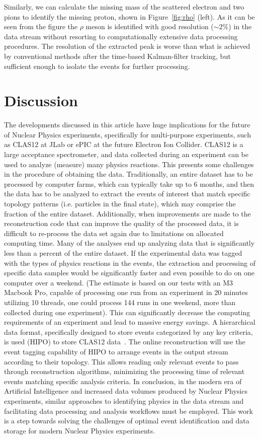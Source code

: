 \documentclass[a4paper,11pt]{article}
\begin{document}
Similarly, we can calculate the missing mass of the scattered electron and two pions to identify the missing proton, shown in Figure~\ref{fig:rho} (left). 
As it can be seen from the figure the $\rho$ meson is identified with good resolution ($\sim 2\%$) in the data stream without resorting to computationally extensive data processing procedures. The resolution of the extracted peak is worse than what is achieved by conventional methods after the time-based Kalman-filter tracking, but sufficient enough to isolate the events for further processing. 

\section{Discussion}

The developments discussed in this article have huge implications for the future of Nuclear Physics experiments, specifically for multi-purpose experiments, such as CLAS12 at JLab or ePIC at the future Electron Ion Collider. CLAS12 is a large acceptance spectrometer, and data collected during an experiment can be used to analyze (measure) many physics reactions. This presents some challenges in the procedure of obtaining the data. Traditionally, an entire dataset has to be processed by computer farms, which can typically take up to 6 months, and then the data has to be analyzed to extract the events of interest that match specific topology patterns (i.e. particles in the final state), which may comprise the fraction of the entire dataset. Additionally, when improvements are made to the reconstruction code that can improve the quality of the processed data, it is difficult to re-process the data set again due to limitations on allocated computing time. Many of the analyses end up analyzing data that is significantly less than a percent of the entire dataset. If the experimental data was tagged with the types of physics reactions in the events, the extraction and processing of specific data samples would be significantly faster and even possible to do on one computer over a weekend. (The estimate is based on our tests with an M3 Macbook Pro, capable of processing one run from an experiment in 20 minutes utilizing 10 threads, one could process 144 runs in one weekend, more than collected during one experiment). This can significantly decrease the computing requirements of an experiment and lead to massive energy savings.
A hierarchical data format, specifically designed to store events categorized by any key criteria, is used (HIPO) to store CLAS12 data~\cite{Gavalian:hipo}.
The online reconstruction will use the event tagging capability of HIPO to arrange events in the output stream according to their topology. This allows reading only relevant events to pass through reconstruction algorithms, minimizing the processing time of relevant events matching specific analysis criteria.
In conclusion, in the modern era of Artificial Intelligence and increased data volumes produced by Nuclear Physics experiments, similar approaches to identifying physics in the data stream and facilitating data processing and analysis workflows must be employed. This work is a step towards solving 
the challenges of optimal event identification and data storage for modern Nuclear Physics experiments.
\end{document}
